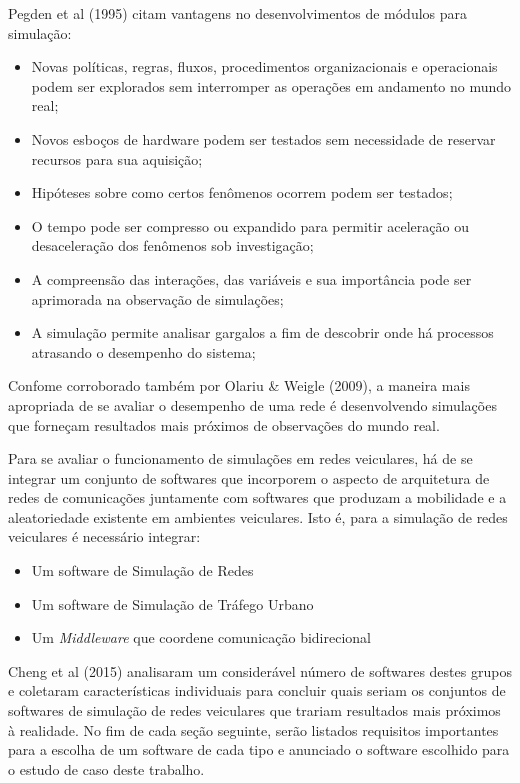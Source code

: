 \documentclass[
12pt,				%
openright,			%
oneside,			%
a4paper,			%
brazil,				%
]{abntex2}
\begin{document}
	\par Pegden et al (1995) citam vantagens no desenvolvimentos de módulos para simulação:
	
	\begin{itemize}
		\item Novas políticas, regras, fluxos, procedimentos organizacionais e operacionais podem ser explorados sem interromper as operações em andamento no mundo real;
		\item Novos esboços de hardware podem ser testados sem necessidade de reservar recursos para sua aquisição;
		\item Hipóteses sobre como certos fenômenos ocorrem podem ser testados;
		\item O tempo pode ser compresso ou expandido para permitir aceleração ou desaceleração dos fenômenos sob investigação;
		\item A compreensão das interações, das variáveis e sua importância pode ser aprimorada na observação de simulações;
		\item A simulação permite analisar gargalos a fim de descobrir onde há processos atrasando o desempenho do sistema;
	\end{itemize}
	
	\par Confome corroborado também por Olariu \& Weigle (2009), a maneira mais apropriada de se avaliar o desempenho de uma rede é desenvolvendo simulações que forneçam resultados mais próximos de observações do mundo real.
	
	\par Para se avaliar o funcionamento de simulações em redes veiculares, há de se integrar um conjunto de softwares que incorporem o aspecto de arquitetura de redes de comunicações juntamente com softwares que produzam a mobilidade e a aleatoriedade existente em ambientes veiculares. Isto é, para a simulação de redes veiculares é necessário integrar:
	
	\begin{itemize}
		\item Um software de Simulação de Redes
		\item Um software de Simulação de Tráfego Urbano
		\item Um \textit{Middleware} que coordene comunicação bidirecional 
	\end{itemize}
	
	\par Cheng et al (2015) analisaram um considerável número de softwares destes grupos e coletaram características individuais para concluir quais seriam os conjuntos de softwares de simulação de redes veiculares que trariam resultados mais próximos à realidade. No fim de cada seção seguinte, serão listados requisitos importantes para a escolha de um software de cada tipo e anunciado o software escolhido para o estudo de caso deste trabalho.
	
\end{document}
